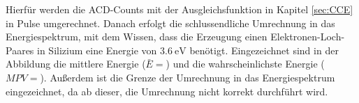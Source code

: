 Hierfür werden die ACD-Counts mit der Ausgleichsfunktion in Kapitel \ref{sec:CCE} in Pulse umgerechnet. Danach erfolgt die schlussendliche Umrechnung in das Energiespektrum, mit dem Wissen, dass die Erzeugung einen Elektronen-Loch-Paares in Silizium eine Energie von $\SI{3.6}{\eV}$ benötigt. Eingezeichnet sind in der Abbildung die mittlere Energie ($\bar{E}=$) und die wahrscheinlichste Energie ($MPV=$). Außerdem ist die Grenze der Umrechnung in das Energiespektrum eingezeichnet, da ab dieser, die Umrechnung nicht korrekt durchführt wird. 
%
%
%     
%
%
